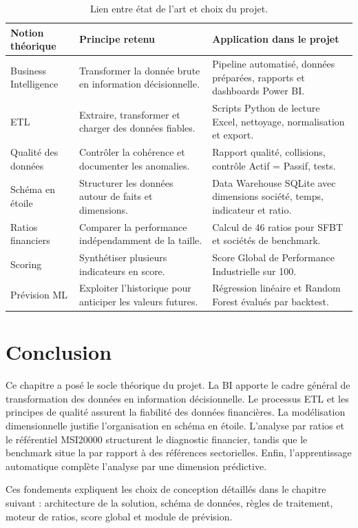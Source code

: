 \begin{table}[H]
\centering
\caption[Synthèse des choix méthodologiques]{Lien entre état de l'art et choix du projet.}
\label{tab:synthesechap2}
\begin{tabularx}{\linewidth}{|p{3.4cm}|X|X|}
\hline
\textbf{Notion théorique} & \textbf{Principe retenu} & \textbf{Application dans le projet} \\ \hline
Business Intelligence & Transformer la donnée brute en information décisionnelle. & Pipeline automatisé, données préparées, rapports et dashboards Power BI. \\ \hline
ETL & Extraire, transformer et charger des données fiables. & Scripts Python de lecture Excel, nettoyage, normalisation et export. \\ \hline
Qualité des données & Contrôler la cohérence et documenter les anomalies. & Rapport qualité, collisions, contrôle Actif = Passif, tests. \\ \hline
Schéma en étoile & Structurer les données autour de faits et dimensions. & Data Warehouse SQLite avec dimensions société, temps, indicateur et ratio. \\ \hline
Ratios financiers & Comparer la performance indépendamment de la taille. & Calcul de 46 ratios pour SFBT et sociétés de benchmark. \\ \hline
Scoring & Synthétiser plusieurs indicateurs en score. & Score Global de Performance Industrielle sur 100. \\ \hline
Prévision ML & Exploiter l'historique pour anticiper les valeurs futures. & Régression linéaire et Random Forest évalués par backtest. \\ \hline
\end{tabularx}
\end{table}

\section*{Conclusion}
\par Ce chapitre a posé le socle théorique du projet. La \ac{BI} apporte le
cadre général de transformation des données en information décisionnelle. Le
processus \ac{ETL} et les principes de qualité assurent la fiabilité des données
financières. La modélisation dimensionnelle justifie l'organisation en schéma en
étoile. L'analyse par ratios et le référentiel MSI20000 structurent le
diagnostic financier, tandis que le benchmark situe la \sfbt par rapport à des
références sectorielles. Enfin, l'apprentissage automatique complète l'analyse
par une dimension prédictive.

\par Ces fondements expliquent les choix de conception détaillés dans le
chapitre suivant : architecture de la solution, schéma de données, règles
de traitement, moteur de ratios, score global et module de prévision.
